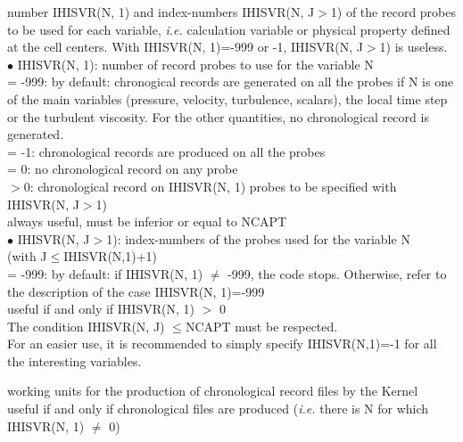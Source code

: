 {number IHISVR(N, 1) and index-numbers IHISVR(N, J$>$1) of the record
probes to be used for each variable, {\em i.e.} calculation variable
or physical property defined at the cell centers.
With IHISVR(N, 1)=-999 or -1, IHISVR(N, J$>$1) is useless.\\
\hspace*{.5cm} $\bullet$ IHISVR(N, 1): number of record probes to use
for the variable N\\
\hspace*{1.3cm}= -999: by default: chronogical records are generated on
all the probes if N is one of the main variables (pressure, velocity,
turbulence, scalars), the local time step or the turbulent
viscosity. For the other quantities, no chronological record is generated.\\
\hspace*{1.3cm}= -1: chronological records are produced on all the probes\\
\hspace*{1.3cm}= 0: no chronological record on any probe\\
\hspace*{1.3cm}$>0$: chronological record on IHISVR(N, 1) probes to be specified
with  IHISVR(N, J$>$1)\\
always useful, must be inferior or equal to NCAPT\\
\hspace*{.5cm} $\bullet$ IHISVR(N, J$>$1): index-numbers of the probes
used for the variable N\\
(with J$\leqslant$IHISVR(N,1)+1)\\
\hspace*{1.3cm}= -999: by default: if IHISVR(N, 1) $\ne$
-999, the  code stops. Otherwise, refer to the description of the case
IHISVR(N, 1)=-999\\
useful if and only if IHISVR(N, 1) $>$ 0 \\
The condition IHISVR(N, J) $\leqslant$NCAPT must be respected.\\
For an easier use, it is recommended to simply specify IHISVR(N,1)=-1 for
all the interesting variables.}

{working units for the production of chronological record files by the Kernel\\
useful if and only if chronological files are produced ({\em i.e.} there
is N for which IHISVR(N, 1) $\ne$ 0)}

